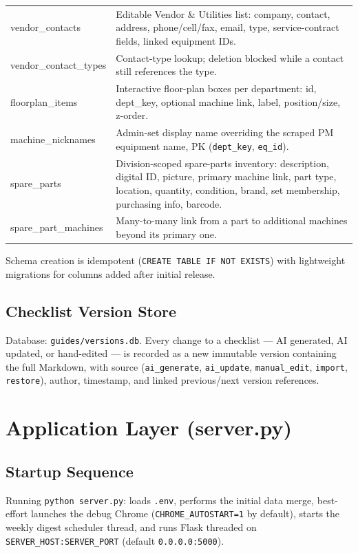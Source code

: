 \documentclass[11pt,a4paper]{article}
\newcommand{\code}[1]{\texttt{#1}}
\begin{document}
\begin{longtable}{@{}>{\ttfamily}p{}p{}@{}}
vendor\_contacts & Editable Vendor \& Utilities list: company, contact, address, phone/cell/fax, email, type, service-contract fields, linked equipment IDs. \\
vendor\_contact\_types & Contact-type lookup; deletion blocked while a contact still references the type. \\
floorplan\_items & Interactive floor-plan boxes per department: id, dept\_key, optional machine link, label, position/size, z-order. \\
machine\_nicknames & Admin-set display name overriding the scraped PM equipment name, PK (\code{dept\_key}, \code{eq\_id}). \\
spare\_parts & Division-scoped spare-parts inventory: description, digital ID, picture, primary machine link, part type, location, quantity, condition, brand, set membership, purchasing info, barcode. \\
spare\_part\_machines & Many-to-many link from a part to additional machines beyond its primary one. \\
\bottomrule
\end{longtable}

Schema creation is idempotent (\code{CREATE TABLE IF NOT EXISTS}) with
lightweight migrations for columns added after initial release.

\subsection{Checklist Version Store}
Database: \code{guides/versions.db}. Every change to a checklist --- AI
generated, AI updated, or hand-edited --- is recorded as a new immutable
version containing the full Markdown, with source (\code{ai\_generate},
\code{ai\_update}, \code{manual\_edit}, \code{import}, \code{restore}),
author, timestamp, and linked previous/next version references.

\section{Application Layer (server.py)}

\subsection{Startup Sequence}
Running \code{python server.py}: loads \code{.env}, performs the initial
data merge, best-effort launches the debug Chrome
(\code{CHROME\_AUTOSTART=1} by default), starts the weekly digest scheduler
thread, and runs Flask threaded on \code{SERVER\_HOST:SERVER\_PORT}
(default \code{0.0.0.0:5000}).
\end{document}
